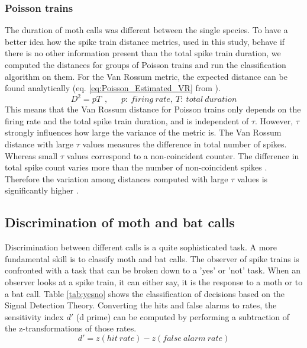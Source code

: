 \documentclass[12pt,a4paper]{article}
\begin{document}
\subsubsection{Poisson trains}
The duration of moth calls was different between the single species. To have a better idea how the spike train distance metrics, used in this study, behave if there is no other information present than the total spike train duration, we computed the distances for groups of Poisson trains and run the classification algorithm on them.
For the Van Rossum metric, the expected distance can be found analytically (eq. \ref{eq:Poisson_Estimated_VR} from \cite{rossum2001}). 
\begin{equation}
\label{eq:Poisson_Estimated_VR}
D^{2} = pT~~,~~~~~~~p:~firing~rate,~T:~total~duration
\end{equation}
This means that the Van Rossum distance for Poisson trains only depends on the firing rate and the total spike train duration, and is independent of $ \tau $. However, $ \tau $ strongly influences how large the variance of the metric is. The Van Rossum distance with large $ \tau $ values measures the difference in total number of spikes. Whereas small $ \tau $ values correspond to  a non-coincident counter. The difference in total spike count varies more than the number of non-coincident spikes \cite{rossum2001}. Therefore the variation among distances computed with large $ \tau $ values is significantly higher \cite{rossum2001}. 

\newpage
\subsection{Discrimination of moth and bat calls}
\label{MvsBMethods}
Discrimination between different calls is a quite sophisticated task. A more fundamental skill is to classify moth and bat calls. The observer of spike trains is confronted with a task that can be broken down to a 'yes' or 'not' task. When an observer looks at a spike train, it can either say, it is the response to a moth or to a bat call. Table \ref{tab:yesno} shows the classification of decisions based on the Signal Detection Theory. Converting the hits and false alarms to rates, the sensitivity index $d'$ (d prime) can be computed by performing a subtraction of the z-transformations of those rates.
\begin{equation}
\label{eq:dprime}
d' = z(hit~rate) - z(false~alarm~rate)
\end{equation}
\end{document}
